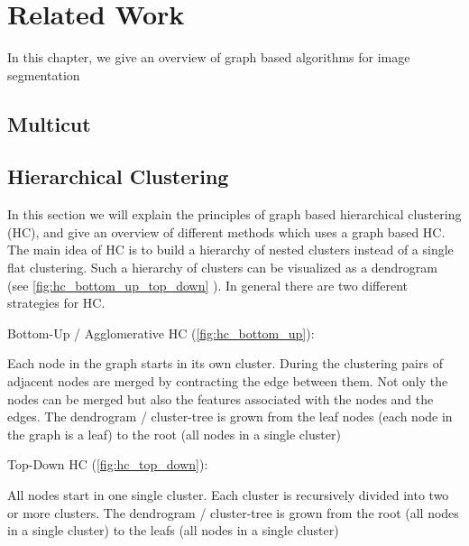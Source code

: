 \chapter{Related Work} \label{ch:reated_work}

In this chapter, we give an overview of graph based algorithms
for image segmentation 

\section{Multicut}\label{sec:rw_multicut}



\section{Hierarchical Clustering}\label{sec:rw_hc}

In this section we will explain the principles of graph based hierarchical clustering (HC),
and  give an overview of different methods which uses a graph based HC.
The main idea of HC is to build a hierarchy of nested clusters instead of
a single flat clustering.
Such a hierarchy of clusters can be visualized as a dendrogram (see \cref{fig:hc_bottom_up_top_down} ).
In general there are two different strategies for HC.
\begin{compactitem}
    \item Bottom-Up / Agglomerative HC (\cref{fig:hc_bottom_up}):

        Each node in the graph starts in its own cluster. 
        During the clustering pairs of adjacent nodes are merged 
        by contracting the edge between them.
        Not only the nodes can be merged but also the features associated with
        the nodes and the edges.
        The dendrogram / cluster-tree is grown from the leaf nodes (each node in the graph is a leaf)
        to the root (all nodes in a single cluster) 

    \item Top-Down HC (\cref{fig:hc_top_down}):

        All nodes start in one single cluster. Each cluster is recursively divided 
        into two or more clusters. 
        The dendrogram / cluster-tree is grown from the root  (all nodes in a single cluster)
        to the leafs (all nodes in a single cluster) 
\end{compactitem}



